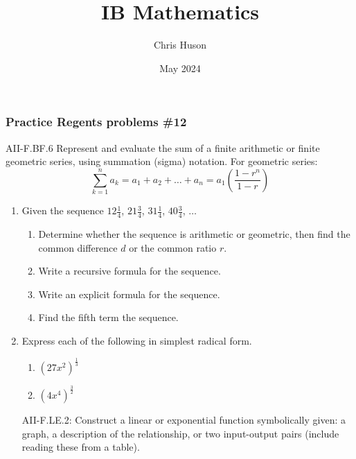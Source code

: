 \documentclass[12pt, twoside]{article}
\title{IB Mathematics}
\author{Chris Huson}
\date{May 2024}
\begin{document}
\subsubsection*{Practice Regents problems \#12}
AII-F.BF.6 Represent and evaluate the sum of a finite arithmetic
or finite geometric series, using summation (sigma) notation. For geometric series:
$$\sum_{k=1}^{n} a_k = a_1 + a_2 + \ldots + a_n = a_1 \left( \frac{1-r^n}{1-r} \right)$$

\begin{enumerate}
\item Given the sequence $12 \frac{1}{4}$, $21 \frac{3}{4}$, $31 \frac{1}{4}$, $40 \frac{3}{4}$, $\ldots$
\begin{enumerate}[itemsep=2cm]
    \item Determine whether the sequence is arithmetic or geometric, then find the common difference $d$ or the common ratio $r$.
    \item Write a recursive formula for the sequence.
    \item Write an explicit formula for the sequence.
    \item Find the fifth term the sequence.
\end{enumerate} \vspace{3cm}

\item Express each of the following in simplest radical form. 
\begin{multicols}{2}
    \begin{enumerate}
        \item $(27x^2)^{\frac{1}{3}}$
        \item $(4x^4)^{\frac{3}{2}}$
    \end{enumerate}
\end{multicols}
\vspace{3cm}

\newpage
AII-F.LE.2: Construct a linear or exponential function symbolically given: a graph, a description of the relationship, or two input-output pairs (include reading these from a table).


\end{enumerate}
\end{document}
